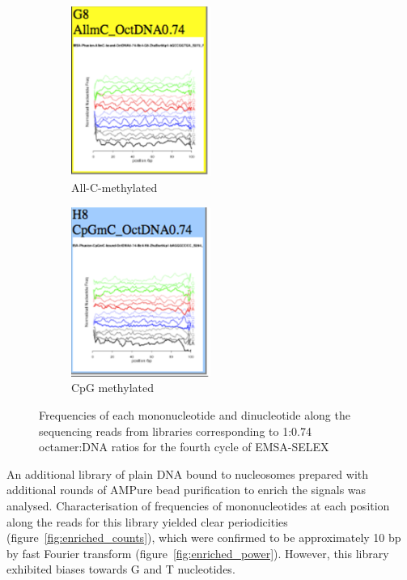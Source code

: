 \documentclass[parskip=full, numbers=noenddot]{scrreprt}
\begin{document}
\begin{figure}[htpb]
  \begin{subfigure}[htpb]{0.5\textwidth}
    \centering
    \includegraphics[width=0.5\textwidth]{emsa_g8_counts}
    \caption{All-C-methylated}
    \label{fig:freqplots_g8}
  \end{subfigure}
  \begin{subfigure}[htpb]{0.5\textwidth}
    \centering
    \includegraphics[width=0.5\textwidth]{emsa_h8_counts}
    \caption{CpG methylated}
    \label{fig:freqplots_h8}
  \end{subfigure}
  \caption{Frequencies of each mononucleotide and dinucleotide along the sequencing reads from libraries corresponding to 1:0.74 octamer:DNA ratios for the fourth cycle of EMSA-SELEX}
  \label{fig:freqplots}
\end{figure}

An additional library of plain DNA bound to nucleosomes prepared with additional rounds of AMPure bead purification to enrich the signals was analysed.  Characterisation of frequencies of mononucleotides at each position along the reads for this library yielded clear periodicities (figure~\ref{fig:enriched_counts}), which were confirmed to be approximately 10 bp by fast Fourier transform (figure~\ref{fig:enriched_power}).  However, this library exhibited biases towards G and T nucleotides.
\end{document}
